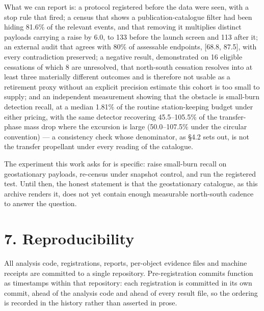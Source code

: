 \documentclass[11pt]{article}
\begin{document}
What we can report is: a protocol registered before the data were seen, with a stop rule that fired; a census that shows a publication-catalogue filter had been hiding 81.6\% of the relevant events, and that removing it multiplies distinct payloads carrying a raise by 6.0, to 133 before the launch screen and 113 after it; an external audit that agrees with 80\% of assessable endpoints, [68.8, 87.5], with every contradiction preserved; a negative result, demonstrated on 16 eligible cessations of which 8 are unresolved, that north-south cessation resolves into at least three materially different outcomes and is therefore not usable as a retirement proxy without an explicit precision estimate this cohort is too small to supply; and an independent measurement showing that the obstacle is small-burn detection recall, at a median 1.81\% of the routine station-keeping budget under either pricing, with the same detector recovering 45.5--105.5\% of the transfer-phase mass drop where the excursion is large (50.0--107.5\% under the circular convention) --- a consistency check whose denominator, as \S{}4.2 sets out, is not the transfer propellant under every reading of the catalogue.

The experiment this work asks for is specific: raise small-burn recall on geostationary payloads, re-census under snapshot control, and run the registered test. Until then, the honest statement is that the geostationary catalogue, as this archive renders it, does not yet contain enough measurable north-south cadence to answer the question.

\section*{7. Reproducibility}

All analysis code, registrations, reports, per-object evidence files and machine receipts are committed to a single repository. Pre-registration commits function as timestamps within that repository: each registration is committed in its own commit, ahead of the analysis code and ahead of every result file, so the ordering is recorded in the history rather than asserted in prose.
\end{document}
